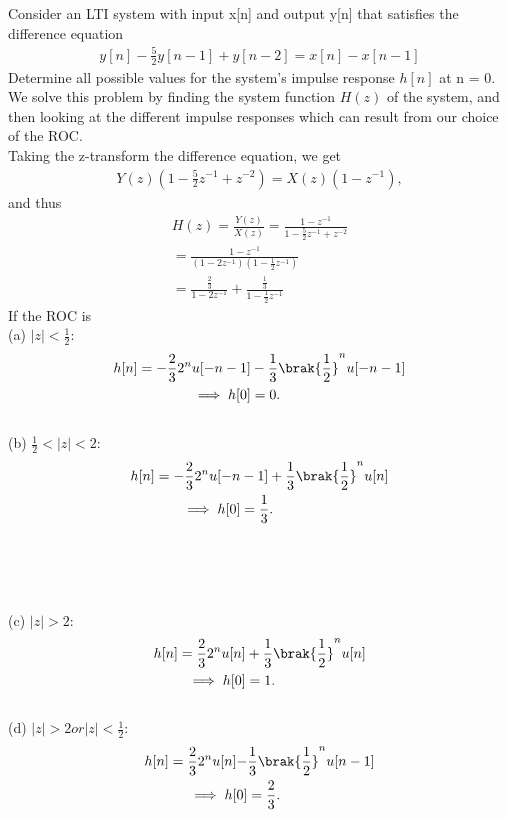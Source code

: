 \documentclass[journal,12pt,twocolumn]{IEEEtran}
\begin{document}
\problem Consider an LTI system with input x[n] and output y[n] that satisfies the difference equation
\begin{align}
	y[n] - \frac{5}{2}y[n-1] + y[n-2] = x[n] - x[n-1]
	\label{eq:transfer}
\end{align}
Determine all possible values for the system's impulse response $h[n]$ at n = 0.
\\
\solution We solve this problem by finding the system function $H(z)$ of the system, and then looking at the different impulse responses which can result from our choice of the ROC.
\\
Taking the z-transform the difference equation, we get 
\begin{align}
	Y(z)(1 - \frac{5}{2}z^{-1} + z^{-2}) = X(z)(1 - z^{-1}),
		 \label{eq:transfer-partial}
\end{align}
and thus  
\begin{align}
	H(z) = \frac{Y(z)}{X(z)} = \frac{1 - z^{-1}}{1 - \frac{5}{2}z^{-1} + z^{-2}}\\
    = \frac{1 - z^{-1}}{(1 - 2z^{-1})(1 - \frac{1}{2}z^{-1})}\\
    = \frac{\frac{2}{3}}{1 - 2z^{-1}} + \frac{\frac{1}{3}}{1 - \frac{1}{2}z^{-1}}
	\label{eq:anun}
\end{align}
If the ROC is
\\
(a) $|z| < \frac{1}{2}:$
\begin{align}
	h[n] = -\frac{2}{3}2^{n}u[-n-1]& -\frac{1}{3}\brak{\frac{1}{2}}^nu[-n-1]
    \\
    \implies h[0] &= 0.
	\label{eq:delta-z}
\end{align}
\\
(b) $\frac{1}{2} < |z| < 2:$
\begin{align}
	h[n] = -\frac{2}{3}2^{n}u[-n&-1] +\frac{1}{3}\brak{\frac{1}{2}}^nu[n]
    \\
    \implies h[0] &= \frac{1}{3}.
	\label{eq:delta-z}
\end{align}
\\
\\
\\
\\
(c) $|z| > 2:$
\begin{align}
	h[n] = \frac{2}{3}2^{n}u[n]& +\frac{1}{3}\brak{\frac{1}{2}}^nu[n]
    \\
    \implies h[0] &= 1.
	\label{eq:delta-z}
\end{align}
\\
(d) $|z| > 2 or |z| < \frac{1}{2}:$
\begin{align}
	h[n] = \frac{2}{3}2^{n}u[n] -&\frac{1}{3}\brak{\frac{1}{2}}^nu[n-1]
    \\
    \implies h[0] &= \frac{2}{3}.
	\label{eq:delta-z}
\end{align}

\end{document}
